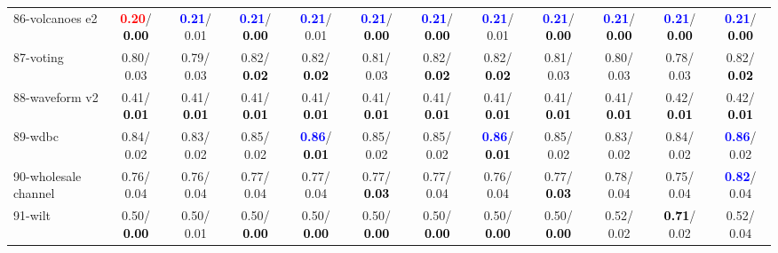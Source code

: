 \begin{table}[h]
\begin{center}
{\begin{tabular}{lc|c|c|c|c|c|c|c|c|c|c}
86-volcanoes e2 & \textcolor{red}{\textbf{  0.20}}/\textcolor{black}{\textbf{  0.00}} & \textcolor{blue}{\textbf{  0.21}}/  0.01 & \textcolor{blue}{\textbf{  0.21}}/\textcolor{black}{\textbf{  0.00}} & \textcolor{blue}{\textbf{  0.21}}/  0.01 & \textcolor{blue}{\textbf{  0.21}}/\textcolor{black}{\textbf{  0.00}} & \textcolor{blue}{\textbf{  0.21}}/\textcolor{black}{\textbf{  0.00}} & \textcolor{blue}{\textbf{  0.21}}/  0.01 & \textcolor{blue}{\textbf{  0.21}}/\textcolor{black}{\textbf{  0.00}} & \textcolor{blue}{\textbf{  0.21}}/\textcolor{black}{\textbf{  0.00}} & \textcolor{blue}{\textbf{  0.21}}/\textcolor{black}{\textbf{  0.00}} & \textcolor{blue}{\textbf{  0.21}}/\textcolor{black}{\textbf{  0.00}} \\
87-voting &   0.80/  0.03 &   0.79/  0.03 &   0.82/\textcolor{black}{\textbf{  0.02}} &   0.82/\textcolor{black}{\textbf{  0.02}} &   0.81/  0.03 &   0.82/\textcolor{black}{\textbf{  0.02}} &   0.82/\textcolor{black}{\textbf{  0.02}} &   0.81/  0.03 &   0.80/  0.03 &   0.78/  0.03 &   0.82/\textcolor{black}{\textbf{  0.02}} \\
88-waveform v2 &   0.41/\textcolor{black}{\textbf{  0.01}} &   0.41/\textcolor{black}{\textbf{  0.01}} &   0.41/\textcolor{black}{\textbf{  0.01}} &   0.41/\textcolor{black}{\textbf{  0.01}} &   0.41/\textcolor{black}{\textbf{  0.01}} &   0.41/\textcolor{black}{\textbf{  0.01}} &   0.41/\textcolor{black}{\textbf{  0.01}} &   0.41/\textcolor{black}{\textbf{  0.01}} &   0.41/\textcolor{black}{\textbf{  0.01}} &   0.42/\textcolor{black}{\textbf{  0.01}} &   0.42/\textcolor{black}{\textbf{  0.01}} \\
89-wdbc &   0.84/  0.02 &   0.83/  0.02 &   0.85/  0.02 & \textcolor{blue}{\textbf{  0.86}}/\textcolor{black}{\textbf{  0.01}} &   0.85/  0.02 &   0.85/  0.02 & \textcolor{blue}{\textbf{  0.86}}/\textcolor{black}{\textbf{  0.01}} &   0.85/  0.02 &   0.83/  0.02 &   0.84/  0.02 & \textcolor{blue}{\textbf{  0.86}}/  0.02 \\
90-wholesale channel &   0.76/  0.04 &   0.76/  0.04 &   0.77/  0.04 &   0.77/  0.04 &   0.77/\textcolor{black}{\textbf{  0.03}} &   0.77/  0.04 &   0.76/  0.04 &   0.77/\textcolor{black}{\textbf{  0.03}} &   0.78/  0.04 &   0.75/  0.04 & \textcolor{blue}{\textbf{  0.82}}/  0.04 \\
91-wilt &   0.50/\textcolor{black}{\textbf{  0.00}} &   0.50/  0.01 &   0.50/\textcolor{black}{\textbf{  0.00}} &   0.50/\textcolor{black}{\textbf{  0.00}} &   0.50/\textcolor{black}{\textbf{  0.00}} &   0.50/\textcolor{black}{\textbf{  0.00}} &   0.50/\textcolor{black}{\textbf{  0.00}} &   0.50/\textcolor{black}{\textbf{  0.00}} &   0.52/  0.02 & \textcolor{black}{\textbf{  0.71}}/  0.02 &   0.52/  0.04 \\

\end{tabular}}
\end{center}
\end{table}

